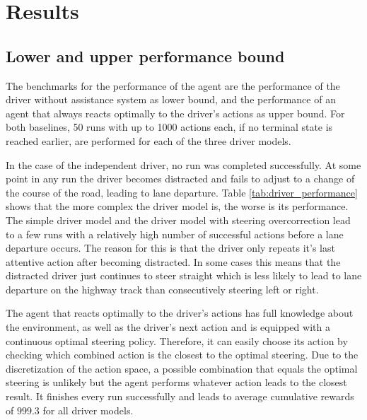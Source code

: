 \chapter{Results}
\label{ch:results}


\section{Lower and upper performance bound}

The benchmarks for the performance of the agent are the performance of the driver without assistance system as lower bound, and the performance of an agent that always reacts optimally to the driver's actions as upper bound. For both baselines, 50 runs with up to 1000 actions each, if no terminal state is reached earlier, are performed for each of the three driver models. 

In the case of the independent driver, no run was completed successfully. At some point in any run the driver becomes distracted and fails to adjust to a change of the course of the road, leading to lane departure. Table \ref{tab:driver_performance} shows that the more complex the driver model is, the worse is its performance. The simple driver model and the driver model with steering overcorrection lead to a few runs with a relatively high number of successful actions before a lane departure occurs. The reason for this is that the driver only repeats it's last attentive action after becoming distracted. In some cases this means that the distracted driver just continues to steer straight which is less likely to lead to lane departure on the highway track than consecutively steering left or right.

The agent that reacts optimally to the driver's actions has full knowledge about the environment, as well as the driver's next action and is equipped with a continuous optimal steering policy. Therefore, it can easily choose its action by checking which combined action is the closest to the optimal steering. Due to the discretization of the action space, a possible combination that equals the optimal steering is unlikely but the agent performs whatever action leads to the closest result. It finishes every run successfully and leads to average cumulative rewards of $999.3$ for all driver models.

